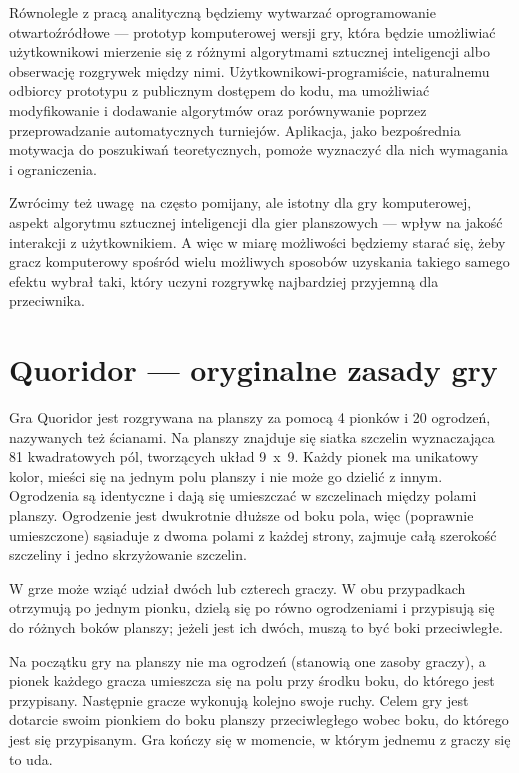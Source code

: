 \documentclass{pracamgr}
\begin{document}
Równolegle z pracą analityczną będziemy wytwarzać oprogramowanie otwartoźródłowe --- prototyp komputerowej wersji gry, która będzie umożliwiać użytkownikowi mierzenie się z różnymi algorytmami sztucznej inteligencji albo obserwację rozgrywek między nimi.
Użytkownikowi-programiście, naturalnemu odbiorcy prototypu z publicznym dostępem do kodu, ma umożliwiać modyfikowanie i dodawanie algorytmów oraz porównywanie poprzez przeprowadzanie automatycznych turniejów.
Aplikacja, jako bezpośrednia motywacja do poszukiwań teoretycznych, pomoże wyznaczyć dla nich wymagania i ograniczenia.

Zwrócimy też uwagę na często pomijany, ale istotny dla gry komputerowej, aspekt algorytmu sztucznej inteligencji dla gier planszowych --- wpływ na jakość interakcji z użytkownikiem.
A więc w miarę możliwości będziemy starać się, żeby gracz komputerowy spośród wielu możliwych sposobów uzyskania takiego samego efektu wybrał taki, który uczyni rozgrywkę najbardziej przyjemną dla przeciwnika.

\section{Quoridor --- oryginalne zasady gry}

Gra Quoridor jest rozgrywana na planszy za pomocą 4 pionków i 20 ogrodzeń, nazywanych też ścianami. Na planszy znajduje się siatka szczelin wyznaczająca 81 kwadratowych pól, tworzących układ 9~x~9. Każdy pionek ma unikatowy kolor, mieści się na jednym polu planszy i nie może go dzielić z innym. Ogrodzenia są identyczne i dają się umieszczać w szczelinach między polami planszy. Ogrodzenie jest dwukrotnie dłuższe od boku pola, więc (poprawnie umieszczone) sąsiaduje z dwoma polami z każdej strony, zajmuje całą szerokość szczeliny i jedno skrzyżowanie szczelin.

W grze może wziąć udział dwóch lub czterech graczy. W obu przypadkach otrzymują po jednym pionku, dzielą się po równo ogrodzeniami i przypisują się do różnych boków planszy; jeżeli jest ich dwóch, muszą to być boki przeciwległe.

Na początku gry na planszy nie ma ogrodzeń (stanowią one zasoby graczy), a pionek każdego gracza umieszcza się na polu przy środku boku, do którego jest przypisany.
Następnie gracze wykonują kolejno swoje ruchy. Celem gry jest dotarcie swoim pionkiem do boku planszy przeciwległego wobec boku, do którego jest się przypisanym. Gra kończy się w momencie, w którym jednemu z graczy się to uda.
\end{document}
